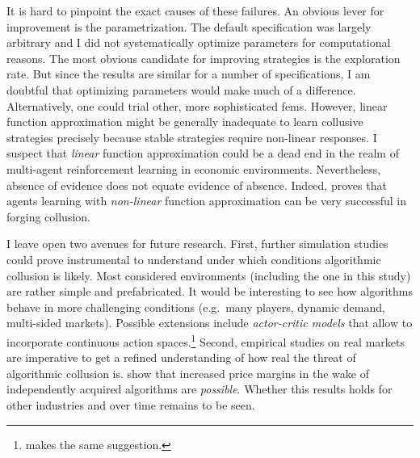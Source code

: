It is hard to pinpoint the exact causes of these failures. An obvious lever for improvement is the parametrization. The default specification was largely arbitrary and I did not systematically optimize parameters for computational reasons. The most obvious candidate for improving strategies is the exploration rate. But since the results are similar for a number of specifications, I am doubtful that optimizing parameters would make much of a difference. Alternatively, one could trial other, more sophisticated \gls{fem}s. However, linear function approximation might be generally inadequate to learn collusive strategies precisely because stable strategies require non-linear responses. I suspect that \emph{linear} function approximation could be a dead end in the realm of multi-agent reinforcement learning in economic environments. Nevertheless, absence of evidence does not equate evidence of absence. Indeed, \textcite{hettich_algorithmic_2021} proves that agents learning with \emph{non-linear} function approximation can be very successful in forging collusion.

I leave open two avenues for future research. First, further simulation studies could prove instrumental to understand under which conditions algorithmic collusion is likely. Most considered environments (including the one in this study) are rather simple and prefabricated. It would be interesting to see how algorithms behave in more challenging conditions (e.g.\ many players, dynamic demand, multi-sided markets). Possible extensions include \emph{actor-critic models} that allow to incorporate continuous action spaces.\footnote{\textcite[p.16]{hettich_algorithmic_2021} makes the same suggestion.} Second, empirical studies on real markets are imperative to get a refined understanding of how real the threat of algorithmic collusion is. \textcite{assad_algorithmic_2020} show that increased price margins in the wake of independently acquired algorithms are \emph{possible}. Whether this results holds for other industries and over time remains to be seen.